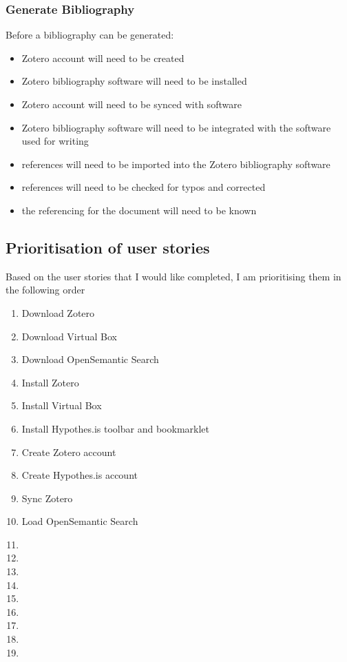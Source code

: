 \documentclass{article}
\begin{document}
\subsubsection*{Generate Bibliography}

Before a bibliography can be generated:
\begin{itemize}
\item Zotero account will need to be created
    \item Zotero bibliography software will need to be installed
    \item Zotero account will need to be synced with software
    \item Zotero bibliography software will need to be integrated with the software used for writing
    \item references will need to be imported into the Zotero bibliography software
    \item references will need to be checked for typos and corrected
    \item the referencing for the document will need to be known
\end{itemize}

\subsection*{Prioritisation of user stories}

Based on the user stories that I would like completed, I am prioritising them in the following order

\begin{enumerate}
    \item Download Zotero
    \item Download Virtual Box
    \item Download OpenSemantic Search
    \item Install Zotero
    \item Install Virtual Box
    \item Install Hypothes.is toolbar and bookmarklet
    \item Create Zotero account
    \item Create Hypothes.is account
    \item Sync Zotero
    \item Load OpenSemantic Search
    \item 
    \item
    \item
    \item
    \item
    \item
    \item
    \item
    \item
\end{enumerate}
\end{document}
